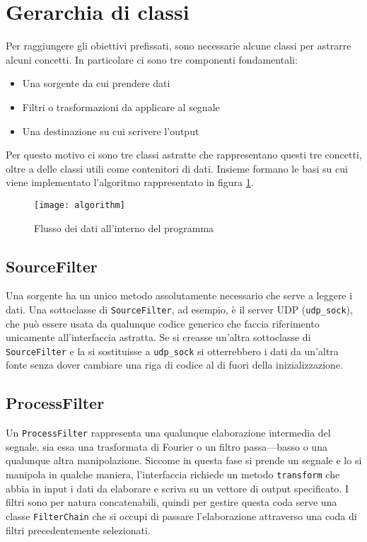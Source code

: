 \section{Gerarchia di classi}
Per raggiungere gli obiettivi prefissati, sono necessarie alcune classi per
astrarre alcuni concetti. In particolare ci sono tre componenti fondamentali:
\begin{itemize}
\item Una sorgente da cui prendere dati
\item Filtri o trasformazioni da applicare al segnale
\item Una destinazione su cui scrivere l'output
\end{itemize}
Per questo motivo ci sono tre classi astratte che rappresentano questi tre
concetti, oltre a delle classi utili come contenitori di dati. Insieme
formano le basi su cui viene implementato l'algoritmo rappresentato in
figura \ref{fig:algorithm}.
\begin{figure}[htb]
	\begin{center}
		\texttt{[image: algorithm]}
	\end{center}
	\caption{Flusso dei dati all'interno del programma}
	\label{fig:algorithm}
\end{figure}

\subsection{SourceFilter}
\label{sourcefilter}
Una sorgente ha un unico metodo assolutamente necessario che serve a leggere i
dati. Una sottoclasse di \texttt{SourceFilter}, ad esempio, \`e il server UDP
(\texttt{udp\_sock}), che pu\`o essere usata da qualunque codice generico che
faccia riferimento unicamente all'interfaccia astratta. Se si creasse un'altra
sottoclasse di \texttt{SourceFilter} e la si sostituisse a \texttt{udp\_sock} si
otterrebbero i dati da un'altra fonte senza dover cambiare una riga di codice al
di fuori della inizializzazione.
\subsection{ProcessFilter}
Un \texttt{ProcessFilter} rappresenta una qualunque elaborazione intermedia del
segnale, sia essa una trasformata di Fourier o un filtro passa---basso o una
qualunque altra manipolazione. Siccome in questa fase si prende un segnale e lo
si manipola in qualche maniera, l'interfaccia richiede un metodo
\texttt{transform} che abbia in input i dati da elaborare e scriva su un vettore
di output specificato. I filtri sono per natura concatenabili, quindi per
gestire questa coda serve una classe \texttt{FilterChain} che si occupi di
passare l'elaborazione attraverso una coda di filtri precedentemente
selezionati.

